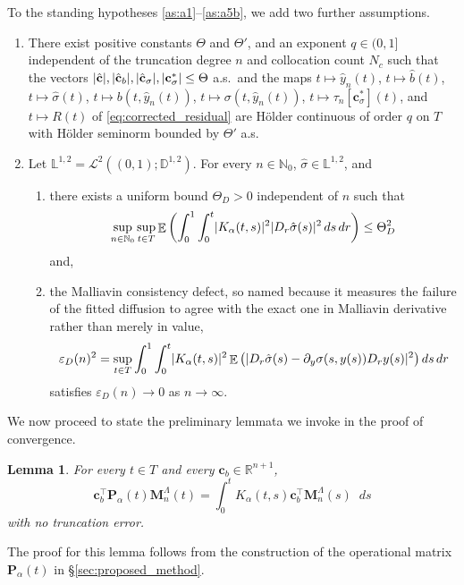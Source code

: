 \documentclass[11pt, a4paper]{article}
\theoremstyle{theoremstyle}
\newtheorem{lemma}[theorem]{Lemma}
\theoremstyle{definitionstyle}
\newcommand{\dd}{\mathop{}\!d}
\DeclareMathOperator{\EE}{\mathbb E}
\DeclarePairedDelimiter{\abs}{\lvert}{\rvert}
\begin{document}
To the standing hypotheses \ref{as:a1}--\ref{as:a5b}, we add two further assumptions.
\begin{enumerate}[resume=assumptions,label=(A\arabic*)]
    \item \label{as:a6} There exist positive constants $\Theta$ and $\Theta'$, and an exponent $q \in (0, 1]$ independent of the truncation degree $n$ and collocation count $N_c$ such that the vectors $\abs{\hat{\mathbf c}}, \abs{\hat{\mathbf c}_b}, \abs{\hat{\mathbf c}_\sigma}, \abs{\mathbf c^*_\sigma} \leq \Theta$ a.s.\ and the maps $t \mapsto \hat y_n(t)$, $t \mapsto \hat b(t)$, $t \mapsto \hat \sigma(t)$, $t \mapsto b(t, \hat y_n(t))$, $t \mapsto \sigma(t, \hat y_n(t))$, $t \mapsto \tau_n[\mathbf c^*_\sigma](t)$, and $t \mapsto R(t)$ of \eqref{eq:corrected_residual} are H\"older continuous of order $q$ on $T$ with H\"older seminorm bounded by $\Theta'$ a.s.
    \item \label{as:a7} Let $\mathbb L^{1,2} = \mathcal L^2((0, 1); \mathbb D^{1, 2})$. For every $n \in \mathbb N_0$, $\hat \sigma \in \mathbb L^{1, 2}$, and
    \begin{enumerate}[label=(\alph*)]
        \item there exists a uniform bound $\Theta_D > 0$ independent of $n$ such that
        \begin{equation}
            \sup_{n \in \mathbb N_0} \sup_{t \in T} \EE \left ( \int_0^1 \int_0^t \abs{K_\alpha(t, s)}^2\abs{D_r\hat \sigma(s)}^2 \dd{s}\dd{r}\right ) \leq \Theta_D^2
        \end{equation}
        and,
        \item the Malliavin consistency defect, so named because it measures the failure of the fitted diffusion to agree with the exact one in Malliavin derivative rather than merely in value,
        \begin{equation}
            \varepsilon_D(n)^2 = \sup_{t \in T} \int_0^1 \int_0^t \abs{K_\alpha(t, s)}^2 \EE \left ( \abs{D_r\hat \sigma(s) - \partial_y\sigma (s, y(s))D_ry(s)}^2 \right )\dd{s}\dd{r}
        \end{equation}
        satisfies $\varepsilon_D(n) \to 0$ as $n \to \infty$.
    \end{enumerate}
\end{enumerate}

We now proceed to state the preliminary lemmata we invoke in the proof of convergence.
\begin{lemma}\label{lem:P_exact}
    For every $t \in T$ and every $\mathbf c_b \in \mathbb R^{n+1}$,
    \begin{equation}
        \mathbf c_b^\top \mathbf P_\alpha(t) \mathbf M_n^\Lambda(t) = \int_0^t K_\alpha(t, s) \mathbf c_b^\top \mathbf M_n^\Lambda(s)\dd{s}
    \end{equation}
    with no truncation error.
\end{lemma}
The proof for this lemma follows from the construction of the operational matrix $\mathbf P_\alpha(t)$ in \S\ref{sec:proposed_method}.
\end{document}
